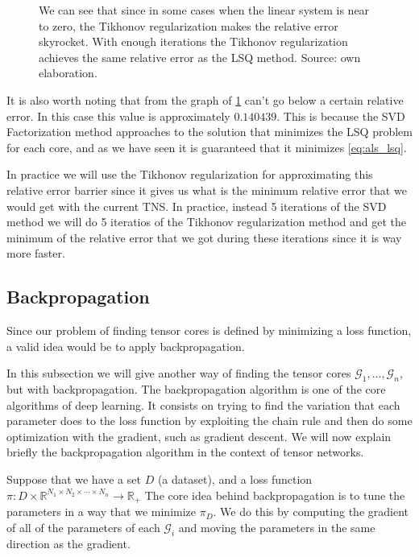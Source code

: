 \documentclass[11pt,a4paper,openright,oneside]{book}
\numberwithin{equation}{section}
\newcommand{\figref}[1]{\cref{#1}}
\begin{document}
{\begin{figure}[H]
{    We can see that
    since in some cases when the linear system is near to zero, the Tikhonov regularization makes the relative
    error skyrocket. With enough iterations the Tikhonov regularization achieves the same
    relative error as the LSQ method.
    Source: own elaboration.}
    \label{fig:als-convergence-tiknov}
\end{figure}
It is also worth noting that from the graph of \figref{fig:als-convergence-tiknov} can't go below
a certain relative error. In this case this value is approximately $0.140439$. This is because the SVD Factorization
method approaches to the solution that minimizes the \gls{LSQ} problem for each core, and as we have seen
it is guaranteed that it minimizes \ref{eq:als_lsq}. 

In practice we will use the Tikhonov regularization for approximating this relative error barrier since it gives us what
is the minimum relative error that we would get with the current \gls{TNS}. In practice, instead 5 iterations of the \gls{SVD} method
we will do 5 iteratios of the Tikhonov regularization method and get the minimum of the relative error that we got during these iterations
since it is way more faster.


\subsection{Backpropagation} \label{backpropagation}

Since our problem of finding tensor cores is defined by minimizing a loss function, a valid idea would be
to apply backpropagation.

In this subsection we will give another way of finding the tensor cores $\mathcal{G}_1, \dots, \mathcal{G}_n$, but with 
backpropagation. The backpropagation algorithm is one of the core algorithms of deep learning. It consists on
trying to find the variation that each parameter does to the loss function by exploiting the chain rule and
then do some optimization with the gradient, such as gradient descent. We will now explain briefly the backpropagation
algorithm in the context of tensor networks.


Suppose that we have a set $D$ (a dataset), and a loss function ${\pi: D \times \mathbb{R}^{N_1 \times N_2 \times \cdots \times N_n} \rightarrow \mathbb{R}_+}$
The core idea behind backpropagation is to tune the parameters in a way that
we minimize $\pi_D$. We do this by computing the gradient of all of the parameters of each $\mathcal{G}_i$ and moving 
the parameters in the same direction as the gradient.

}
\end{document}
